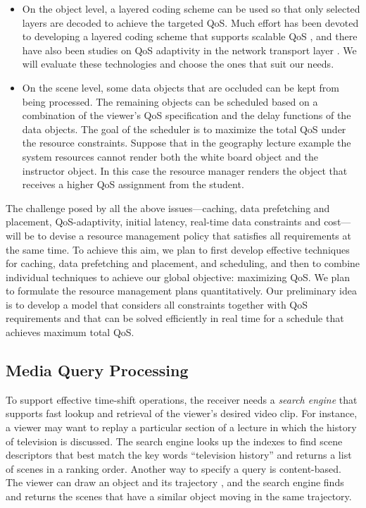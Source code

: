 \begin{itemize}
\item On the object level, a layered coding scheme can
be used so that only selected layers are decoded to achieve
the targeted QoS.  Much effort has been devoted to developing a
layered coding scheme that supports scalable QoS \cite{ex220,ex62},
and there have also been studies on QoS adaptivity
in the network transport layer \cite{ex56,ex96,ex95}.
We will evaluate these technologies and choose the ones
that suit our needs.

\item On the scene level, some data objects
that are occluded can be kept from
being processed. The remaining objects can be scheduled
based on a combination of the viewer's QoS specification
and the delay functions of the data objects. The goal
of the scheduler is to maximize the total QoS
under the resource constraints.
Suppose that in the geography lecture example the
system resources cannot render both the white board object
and the instructor object. In this case the resource manager
renders the object that receives a higher QoS assignment   
from the student.
\end{itemize}

The challenge posed by all the above issues---caching, data prefetching
and placement, QoS-adaptivity, initial latency, real-time
data constraints and cost---will be to
devise a resource management policy that satisfies all
requirements at the same time.
To achieve this aim, we plan to
first develop effective techniques for caching, data
prefetching and placement, and scheduling, and then to
combine individual techniques to achieve our global
objective: maximizing QoS. We plan to
formulate the resource management plans quantitatively.
Our preliminary idea is to develop a model that considers all
constraints together with QoS requirements
and that can be solved efficiently in real time
for a schedule that achieves maximum total QoS.
                                                     
\subsection{Media Query Processing}

To support effective time-shift operations, the receiver needs
a {\em search engine} that supports fast lookup and retrieval
of the viewer's desired video clip. For instance, a
viewer may want to replay a particular section of a
lecture in which the history of television is discussed.
The search engine looks up the indexes to find
scene descriptors that best match the key words ``television
history'' and returns
a list of scenes in a ranking order.
Another way to specify a query is content-based. The viewer can draw
an object and its trajectory \cite{Ccmsz97}, and 
the search engine finds
and returns the scenes that have a similar object 
moving in the same trajectory. 

